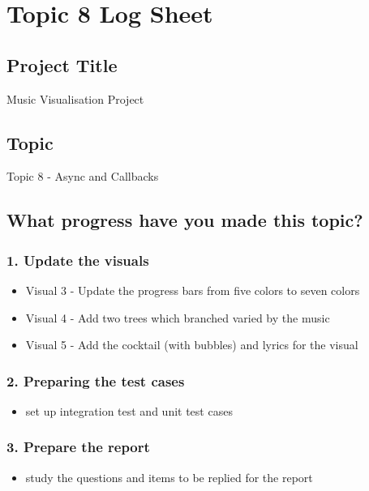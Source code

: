 \chapter*{Topic 8 Log Sheet}

\section*{Project Title}

Music Visualisation Project

\section*{Topic}

Topic 8 - Async and Callbacks

\section*{What progress have you made this topic?}

\subsection*{1. Update the visuals}

\begin{itemize}
  \item Visual 3 - Update the progress bars from five colors to seven colors
  \item Visual 4 - Add two trees which branched varied by the music
  \item Visual 5 - Add the cocktail (with bubbles) and lyrics for the visual
\end{itemize}

\subsection*{2. Preparing the test cases}

\begin{itemize}
  \item set up integration test and unit test cases
\end{itemize}

\subsection*{3. Prepare the report}

\begin{itemize}
  \item study the questions and items to be replied for the report
\end{itemize}


